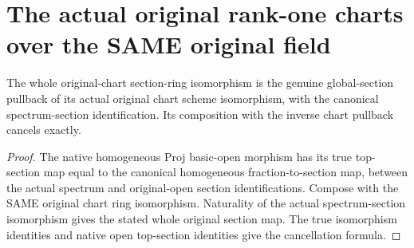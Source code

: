 \section{The actual original rank-one charts over the SAME original field}

\begin{lemma}
\label{lem:fc-native-rank-one-chart-section-coherence}
\leanok
{}
The whole original-chart section-ring isomorphism is the genuine
global-section pullback of its actual original chart scheme
isomorphism, with the canonical spectrum-section identification. Its
composition with the inverse chart pullback cancels exactly.
\end{lemma}
\begin{proof}
The native homogeneous Proj basic-open morphism has its true top-section
map equal to the canonical homogeneous fraction-to-section map, between
the actual spectrum and original-open section identifications. Compose
with the SAME original chart ring isomorphism. Naturality of the actual
spectrum-section isomorphism gives the stated whole original section
map. The true isomorphism identities and native open top-section
identities give the cancellation formula.
\end{proof}

